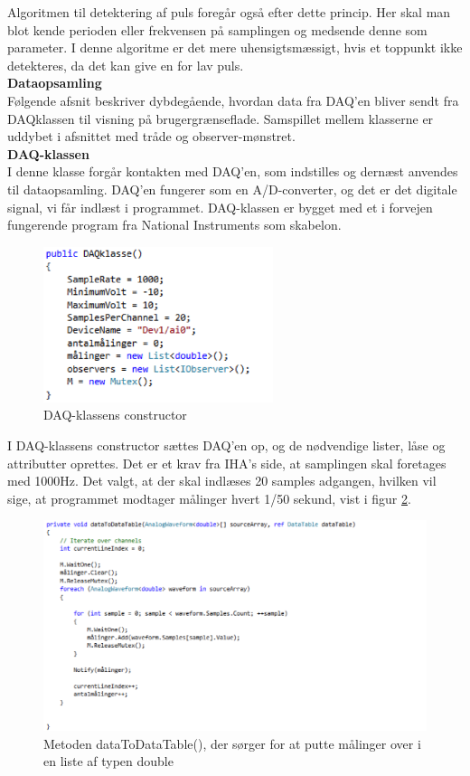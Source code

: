 Algoritmen til detektering af puls foregår også efter dette princip. Her skal man blot kende perioden eller frekvensen på samplingen og medsende denne som parameter.
I denne algoritme er det mere uhensigtsmæssigt, hvis et toppunkt ikke detekteres, da det kan give en for lav puls.\\
\textbf{Dataopsamling}\\
Følgende afsnit beskriver dybdegående, hvordan data fra DAQ’en bliver sendt fra DAQklassen til visning på brugergrænseflade. Samspillet mellem klasserne er uddybet i afsnittet med tråde og observer-mønstret.\\
\textbf{DAQ-klassen}\\
I denne klasse forgår kontakten med DAQ’en, som indstilles og dernæst anvendes til dataopsamling. DAQ’en fungerer som en A/D-converter, og det er det digitale signal, vi får indlæst i programmet. DAQ-klassen er bygget med et i forvejen fungerende program fra National Instruments som skabelon\cite{NI kode}.

\begin{figure}[H]
	\includegraphics[width=0.6\textwidth]{Figurer/Jeppe/3}
	\caption{DAQ-klassens constructor}
	\label{kode3}
\end{figure}

I DAQ-klassens constructor sættes DAQ'en op, og de nødvendige lister, låse og attributter oprettes.
Det er et krav fra IHA's side, at samplingen skal foretages med 1000Hz. Det valgt, at der skal indlæses 20 samples adgangen, hvilken vil sige, at programmet modtager målinger hvert 1/50 sekund, vist i figur \ref{kode4}.

\begin{figure}[H]
	\includegraphics[width=1.3\textwidth]{Figurer/Jeppe/4}
	\caption{Metoden dataToDataTable(), der sørger for at putte målinger over i en liste af typen double}
	\label{kode4}
\end{figure}

